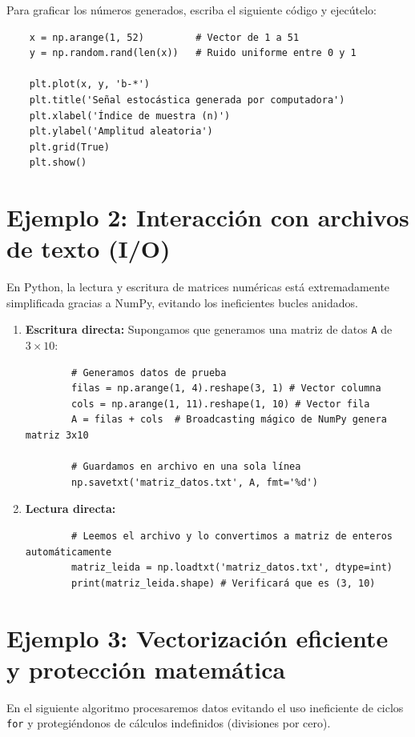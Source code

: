 Para graficar los números generados, escriba el siguiente código y ejecútelo:
\begin{verbatim}
	x = np.arange(1, 52)         # Vector de 1 a 51
	y = np.random.rand(len(x))   # Ruido uniforme entre 0 y 1
	
	plt.plot(x, y, 'b-*')
	plt.title('Señal estocástica generada por computadora')
	plt.xlabel('Índice de muestra (n)')
	plt.ylabel('Amplitud aleatoria')
	plt.grid(True)
	plt.show()
\end{verbatim}

\section{Ejemplo 2: Interacción con archivos de texto (I/O)}

En Python, la lectura y escritura de matrices numéricas está extremadamente simplificada gracias a NumPy, evitando los ineficientes bucles anidados.

\begin{enumerate}
	\item \textbf{Escritura directa:} Supongamos que generamos una matriz de datos \texttt{A} de $3 \times 10$:
	\begin{verbatim}
		# Generamos datos de prueba
		filas = np.arange(1, 4).reshape(3, 1) # Vector columna
		cols = np.arange(1, 11).reshape(1, 10) # Vector fila
		A = filas + cols  # Broadcasting mágico de NumPy genera matriz 3x10
		
		# Guardamos en archivo en una sola línea
		np.savetxt('matriz_datos.txt', A, fmt='%d')
	\end{verbatim}
	
	\item \textbf{Lectura directa:}
	\begin{verbatim}
		# Leemos el archivo y lo convertimos a matriz de enteros automáticamente
		matriz_leida = np.loadtxt('matriz_datos.txt', dtype=int)
		print(matriz_leida.shape) # Verificará que es (3, 10)
	\end{verbatim}
\end{enumerate}

\section{Ejemplo 3: Vectorización eficiente y protección matemática}

En el siguiente algoritmo procesaremos datos evitando el uso ineficiente de ciclos \texttt{for} y protegiéndonos de cálculos indefinidos (divisiones por cero).

